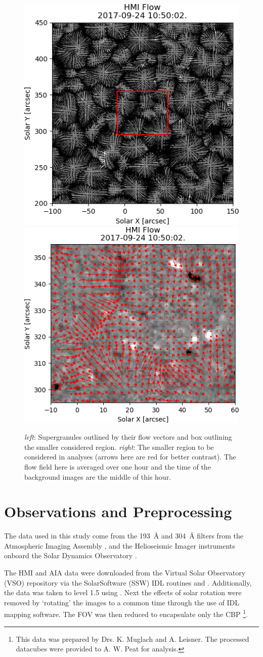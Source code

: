 \begin{figure} 
    \centering
    \includegraphics[width=0.435\linewidth]{./04CBPs/figs/grans.png}
    \includegraphics[width=0.49\linewidth]{./04CBPs/figs/smallflow.png}
    \caption[Supergranular flows and Zoomed Window of Region of Interest.]{\textit{left}: Supergranules outlined by their flow vectors and box outlining the smaller considered region. \textit{right}: The smaller region to be considered in analyses (arrows here are red for better contrast). The flow field here is averaged over one hour and the time of the background images are the middle of this hour.}
    \label{supergrans}
\end{figure}


\section{Observations and Preprocessing}


The data used in this study come from the 193~\AA{} and 304~\AA{} filters from the Atmospheric Imaging Assembly \citep[AIA; ][]{lemen_atmospheric_2012}, and the Helioseismic Imager \citep[HMI; ][]{scherrer_helioseismic_2012} instruments onboard the Solar Dynamics Observatory \citep[SDO; ][]{pesnell_solar_2012}.

The HMI and AIA data were downloaded from the Virtual Solar Observatory (VSO) repository via the SolarSoftware (SSW) IDL routines  and . Additionally, the data was taken to level 1.5 using . Next the effects of solar rotation were removed by `rotating' the images to a common time through the use of IDL mapping software. The FOV was then reduced to encapsulate only the CBP \footnote{This data was prepared by Drs. K. Muglach and A. Leisner. The processed datacubes were provided to A. W. Peat for analysis.}.

